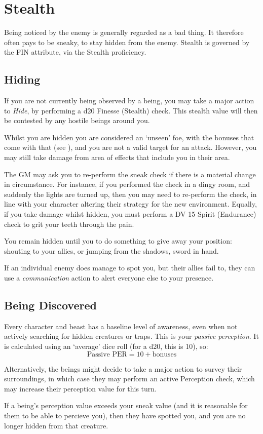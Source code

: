 \section{Stealth} \label{S:Stealth}

Being noticed by the enemy is generally regarded as a bad thing. It therefore often pays to be sneaky, to stay hidden from the enemy. Stealth is governed by the FIN attribute, via the Stealth proficiency. 

\subsection{Hiding}

If you are not currently being observed by a being, you may take a major action to {\it Hide}, by performing a d20 Finesse (Stealth) check. This stealth value will then be contested by any hostile beings around you. 

Whilst you are hidden you are considered an `unseen' foe, with the bonuses that come with that (see \pageref{S:Unseen}), and you are not a valid target for an attack. However, you may still take damage from area of effects that include you in their area. 

The GM may ask you to re-perform the sneak check if there is a material change in circumstance. For instance, if you performed the check in a dingy room, and suddenly the lights are turned up, then you may need to re-perform the check, in line with your character altering their strategy for the new environment. Equally, if you take damage whilst hidden, you must perform a DV 15 Spirit (Endurance) check to grit your teeth through the pain. 

You remain hidden until you to do something to give away your position: shouting to your allies, or jumping from the shadows, sword in hand. 

If an individual enemy does manage to spot you, but their allies fail to, they can use a {\it communication} action to alert everyone else to your presence. 


\subsection{Being Discovered}

Every character and beast has a baseline level of awareness, even when not actively searching for hidden creatures or traps. This is your {\it passive perception}. It is calculated using an `average' dice roll (for a d20, this is 10), so: 
$$\text{Passive PER} = 10 + \text{bonuses}$$

Alternatively, the beings might decide to take a major action to survey their surroundings, in which case they may perform an active Perception check, which may increase their perception value for this turn. 

If a being's perception value exceeds your sneak value (and it is reasonable for them to be able to percieve you), then they have spotted you, and you are no longer hidden from that creature.  



